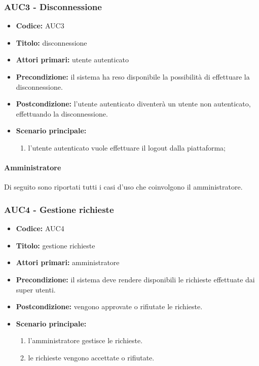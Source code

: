 \documentclass[casi-duso]{subfiles}
\begin{document}
\subsubsection{AUC3 - Disconnessione}%
\label{subsub:AUC3}
\begin{itemize}
  \item \textbf{Codice:} AUC3
  \item \textbf{Titolo:} disconnessione
  \item \textbf{Attori primari:} utente autenticato
  \item \textbf{Precondizione:} il sistema ha reso disponibile la possibilità di effettuare la disconnessione.
  \item \textbf{Postcondizione:} l'utente autenticato diventerà un utente non autenticato, effettuando la disconnessione.
  \item \textbf{Scenario principale:} 
  \begin{enumerate}
    \item l'utente autenticato vuole effettuare il logout dalla piattaforma;
  \end{enumerate}
\end{itemize}

\paragraph{Amministratore}%
\label{par:amministratore}
Di seguito sono riportati tutti i casi d'uso che coinvolgono il  amministratore.



\subsubsection{AUC4 - Gestione richieste}%
\label{subsub:AUC4}
\begin{itemize}
  \item \textbf{Codice:} AUC4
  \item \textbf{Titolo:} gestione richieste
  \item \textbf{Attori primari:} amministratore
  \item \textbf{Precondizione:} il sistema deve rendere disponibili le richieste effettuate dai super utenti.
  \item \textbf{Postcondizione:} vengono approvate o rifiutate le richieste.
  \item \textbf{Scenario principale:} 
  \begin{enumerate}
    \item l'amministratore gestisce le richieste.
    \item le richieste vengono accettate o rifiutate.
  \end{enumerate}
\end{itemize}
\end{document}
